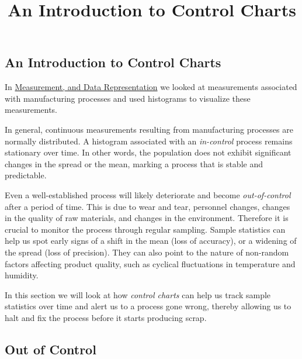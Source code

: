 \documentclass{ximera}
\author{}
\title{An Introduction to Control Charts} \license{CC BY-NC-SA 4.0}
\begin{document}
\begin{abstract}
\end{abstract}
\maketitle

\begin{onlineOnly}
\section*{An Introduction to Control Charts}
\end{onlineOnly}

In \href{https://ximera.osu.edu/qcstats/QC_stats/STAT_QC-0100/main}{Measurement, and Data Representation} we looked at measurements associated with manufacturing processes and used histograms to visualize these measurements. 

In general, continuous measurements resulting from manufacturing processes are normally distributed.  A histogram associated with an \emph{in-control} process remains stationary over time. In other words, the population does not exhibit significant changes in the spread or the mean, marking a process that is stable and predictable.


 Even a well-established process will likely deteriorate and become \emph{out-of-control} after a period of time.  This is due to wear and tear, personnel changes, changes in the quality of raw materials, and changes in the environment.  Therefore it is crucial to monitor the process through regular sampling.  Sample statistics can help us spot early signs of a shift in the mean (loss of accuracy), or a widening of the spread (loss of precision).  They can also point to the nature of non-random factors affecting product quality, such as cyclical fluctuations in temperature and humidity.

 In this section we will look at how \emph{control charts} can help us track sample statistics over time and alert us to a process gone wrong, thereby allowing us to halt and fix the process before it starts producing scrap.

\subsection*{Out of Control}
\end{document}
